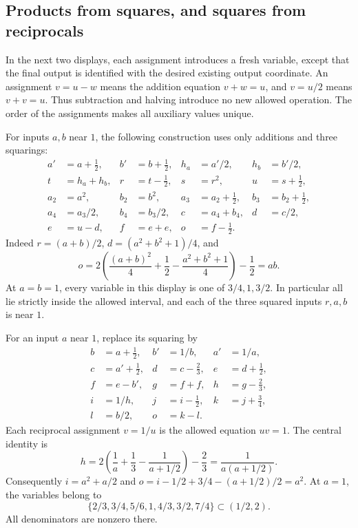 \subsection{Products from squares, and squares from reciprocals}

In the next two displays, each assignment introduces a fresh variable,
except that the final output is identified with the desired existing
output coordinate. An assignment $v=u-w$ means the addition equation
$v+w=u$, and $v=u/2$ means $v+v=u$. Thus subtraction and halving
introduce no new allowed operation. The order of the assignments makes
all auxiliary values unique.

For inputs $a,b$ near $1$, the following construction uses only additions
and three squarings:
\begin{equation}
\label{eq:product-square-chain}
\begin{aligned}
 a'&=a+\tfrac12,& b'&=b+\tfrac12,&
 h_a&=a'/2,& h_b&=b'/2,\\
 t&=h_a+h_b,& r&=t-\tfrac12,& s&=r^2,& u&=s+\tfrac12,\\
 a_2&=a^2,& b_2&=b^2,& a_3&=a_2+\tfrac12,& b_3&=b_2+\tfrac12,\\
 a_4&=a_3/2,& b_4&=b_3/2,& c&=a_4+b_4,& d&=c/2,\\
 e&=u-d,& f&=e+e,& o&=f-\tfrac12.&&
\end{aligned}
\end{equation}
Indeed $r=(a+b)/2$, $d=(a^2+b^2+1)/4$, and
\[
 o=2\left(\frac{(a+b)^2}{4}+\frac12
             -\frac{a^2+b^2+1}{4}\right)-\frac12=ab.
\]
At $a=b=1$, every variable in this display is one of $3/4,1,3/2$.
In particular all lie strictly inside the allowed interval, and each
of the three squared inputs $r,a,b$ is near $1$.

For an input $a$ near $1$, replace its squaring by
\begin{equation}
\label{eq:square-inverse-chain}
\begin{aligned}
 b&=a+\tfrac12,& b'&=1/b,& a'&=1/a,\\
 c&=a'+\tfrac12,& d&=c-\tfrac23,& e&=d+\tfrac12,\\
 f&=e-b',& g&=f+f,& h&=g-\tfrac23,\\
 i&=1/h,& j&=i-\tfrac12,& k&=j+\tfrac34,\\
 l&=b/2,& o&=k-l.&&
\end{aligned}
\end{equation}
Each reciprocal assignment $v=1/u$ is the allowed equation $uv=1$.
The central identity is
\[
 h=2\left(\frac1a+\frac13-\frac1{a+1/2}\right)-\frac23
   =\frac1{a(a+1/2)}.
\]
Consequently $i=a^2+a/2$ and
$o=i-1/2+3/4-(a+1/2)/2=a^2$.
At $a=1$, the variables belong to
\[
 \{2/3,3/4,5/6,1,4/3,3/2,7/4\}\subset(1/2,2).
\]
All denominators are nonzero there.


